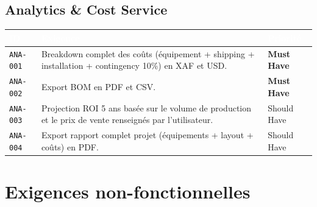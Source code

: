 \documentclass[12pt,a4paper]{article}
\newcommand{\req}[1]{\texttt{\textcolor{daedalusblue}{#1}}}
\newcommand{\musthave}{\cellcolor{musthave}\textbf{Must Have}}
\newcommand{\shouldhave}{\cellcolor{shouldhave}Should Have}
\begin{document}
\subsection{Analytics \& Cost Service}

\begin{tabularx}{\textwidth}{|l|X|l|}
\hline
\rowcolor{tablehead}\textcolor{white}{\textbf{ID}} & \textcolor{white}{\textbf{Exigence}} & \textcolor{white}{\textbf{Priorité}} \\
\hline
\req{ANA-001} & Breakdown complet des coûts (équipement + shipping + installation + contingency 10\%) en XAF et USD. & \musthave \\
\hline
\req{ANA-002} & Export BOM en PDF et CSV. & \musthave \\
\hline
\req{ANA-003} & Projection ROI 5 ans basée sur le volume de production et le prix de vente renseignés par l'utilisateur. & \shouldhave \\
\hline
\req{ANA-004} & Export rapport complet projet (équipements + layout + coûts) en PDF. & \shouldhave \\
\hline
\end{tabularx}

\section{Exigences non-fonctionnelles}
\end{document}
